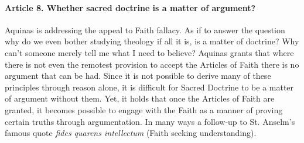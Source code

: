 \documentclass{ucetd}
\begin{document}
\paragraph{Article 8. Whether sacred doctrine is a matter of argument?}
Aquinas is addressing the appeal to Faith fallacy. As if to answer the question why do we even bother studying theology if all it is, is a matter of doctrine? Why can't someone merely tell me what I need to believe? Aquinas grants that where there is not even the remotest provision to accept the Articles of Faith there is no argument that can be had. Since it is not possible to derive many of these principles through reason alone, it is difficult for Sacred Doctrine to be a matter of argument without them. Yet, it holds that once the Articles of Faith are granted, it becomes possible to engage with the Faith as a manner of proving certain truths through argumentation. In many ways a follow-up to St. Anselm's famous quote \textit{fides quarens intellectum} (Faith seeking understanding).
\end{document}
